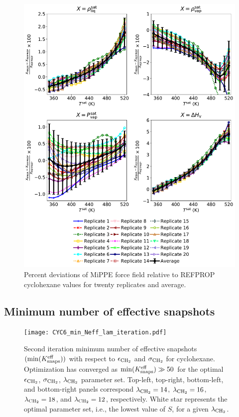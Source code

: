 \documentclass[journal=jctc,manuscript=article]{achemso}
\begin{document}
	\begin{figure}[H]
		\centering
		\includegraphics[width=5.8in]{CYC6_deviations_20replicates.pdf}
		\caption{Percent deviations of MiPPE force field relative to REFPROP cyclohexane values for twenty replicates and average.}
		\label{SI fig: VLE cyclohexane replicates}
	\end{figure}

\newpage
\clearpage

\subsection{Minimum number of effective snapshots} \label{SI sec: Min eff}

\begin{figure}[htb!]
	\centering
	\texttt{[image: CYC6\_min\_Neff\_lam\_iteration.pdf]}
	\caption{Second iteration minimum number of effective snapshots $(\min(K_{\rm snaps}^{\rm eff}))$ with respect to $\epsilon_{\rm CH_2}$ and $\sigma_{\rm CH_2}$ for cyclohexane. Optimization has converged as $\min(K_{\rm snaps}^{\rm eff}) \gg 50$ for the optimal $\epsilon_{\rm CH_2}$, $\sigma_{\rm CH_2}$, $\lambda_{\rm CH_2}$ parameter set. Top-left, top-right, bottom-left, and bottom-right panels correspond $\lambda_{\rm CH_2} = 14$, $\lambda_{\rm CH_2} = 16$, $\lambda_{\rm CH_2} = 18$, and $\lambda_{\rm CH_2} = 12$, respectively. White star represents the optimal parameter set, i.e., the lowest value of $S$, for a given $\lambda_{\rm CH_2}$.}
	\label{SI fig:Iterate_Neff_CYC6}
\end{figure}
\end{document}
